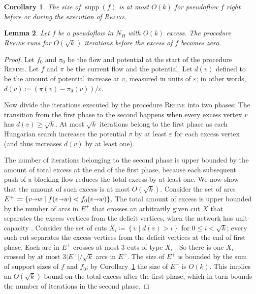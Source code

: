 \documentclass[11pt]{article}
\makeatletter
\def\etal{\textit{et~al.}}
\def\eps{\varepsilon}
\def\abs#1{\mathopen| #1 \mathclose|}		%
\def\Set#1{\left\{ #1 \right\}}
\def\arcto{\mathord\shortrightarrow}
\def\arc#1#2{#1\arcto#2}
\def\supp{\operatorname{supp}}
\theoremstyle{plain}
\newtheorem{lemma}{Lemma}[section]
\newtheorem{corollary}[lemma]{Corollary}
\numberwithin{figure}{section}
\def\EMPH#1{\textbf{\boldmath #1}}
\def\n@te#1{\textsf{\boldmath \textbf{$\langle\!\langle$#1$\rangle\!\rangle$}}\leavevmode}
\def\note#1{\textcolor{red}{\n@te{#1}}}
\makeatother
\begin{document}
\begin{corollary}
\label{corollary:support_size_during}
The size of $\supp(f)$ is at most $O(k)$ for pseudoflow $f$ right before or during the execution of \textsc{Refine}.
\end{corollary}


\begin{lemma}
\label{lemma:goldberg_refine_iterations}
Let $f$ be a pseudoflow in $N_H$ with $O(k)$ excess.
The procedure \textsc{Refine} runs for $O(\sqrt{k})$ iterations
before the excess of $f$ becomes zero.
\end{lemma}

\begin{proof}
Let $f_0$ and $\pi_0$ be the flow and potential at the start of the procedure \textsc{Refine}.  Let $f$ and $\pi$ be the current flow and the potential.
Let \EMPH{$d(v)$} defined to be the amount of potential increase at $v$, measured in units of $\eps$; in other words, $d(v) \coloneqq (\pi(v) - \pi_0(v)) / \eps$.
%

Now divide the iterations executed by
the procedure \textsc{Refine}
into two phases:  The transition from the first phase to the second happens when every excess vertex $v$ has $d(v) \ge \sqrt{k}$.
%
At most $\sqrt{k}$ iterations belong to
the first phase as each Hungarian search increases the potential $\pi$ by at least $\eps$ for each excess vertex (and thus increases $d(v)$ by at least one).

The number of iterations
belonging to the second phase is upper bounded by the amount of total excess at the end of the first phase, because each subsequent push of a blocking flow reduces the total excess by at least one.  We now show that the amount of such excess is at most $O(\sqrt{k})$.
%
Consider the set of arcs $\EMPH{$E^+$} \coloneqq \Set{\arc vw \mid f(\arc vw) < f_0(\arc vw)}$.
The total amount of excess is upper bounded by the number of arcs in $E^+$ that crosses an arbitrarily given cut $X$ that separates the excess vertices from the deficit vertices, when the network has unit-capacity \cite[Lemma~3.6]{GHKT17}.
%
Consider the set of cuts $X_i \coloneqq \Set{v \mid d(v) > i}$ for $0 \le i < \sqrt{k}$; every such cut separates the excess vertices from the deficit vertices at the end of first phase.
Each arc in $E^+$ crosses at most $3$ cuts of type $X_i$ \cite[Lemma~3.1]{GHKT17}.  So there is one $X_i$ crossed by at most $3\abs{E^+}/\sqrt{k}$ arcs in $E^+$.
%
The size of $E^+$ is bounded by the sum of support sizes of $f$ and $f_0$; by Corollary~\ref{corollary:support_size_during} the size of $E^+$ is $O(k)$.
This implies an $O(\sqrt{k})$ bound on the total excess after the first phase, which in turn bounds the number of iterations in the second phase.
\end{proof}
\end{document}

